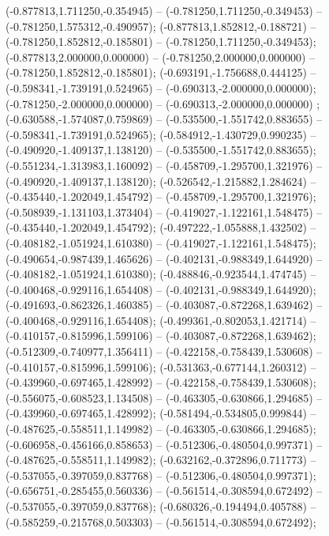  (-0.877813,1.711250,-0.354945) -- (-0.781250,1.711250,-0.349453) -- (-0.781250,1.575312,-0.490957);
 (-0.877813,1.852812,-0.188721) -- (-0.781250,1.852812,-0.185801) -- (-0.781250,1.711250,-0.349453);
 (-0.877813,2.000000,0.000000) -- (-0.781250,2.000000,0.000000) -- (-0.781250,1.852812,-0.185801);
 (-0.693191,-1.756688,0.444125) -- (-0.598341,-1.739191,0.524965) -- (-0.690313,-2.000000,0.000000);
 (-0.781250,-2.000000,0.000000) -- (-0.690313,-2.000000,0.000000) ;
 (-0.630588,-1.574087,0.759869) -- (-0.535500,-1.551742,0.883655) -- (-0.598341,-1.739191,0.524965);
 (-0.584912,-1.430729,0.990235) -- (-0.490920,-1.409137,1.138120) -- (-0.535500,-1.551742,0.883655);
 (-0.551234,-1.313983,1.160092) -- (-0.458709,-1.295700,1.321976) -- (-0.490920,-1.409137,1.138120);
 (-0.526542,-1.215882,1.284624) -- (-0.435440,-1.202049,1.454792) -- (-0.458709,-1.295700,1.321976);
 (-0.508939,-1.131103,1.373404) -- (-0.419027,-1.122161,1.548475) -- (-0.435440,-1.202049,1.454792);
 (-0.497222,-1.055888,1.432502) -- (-0.408182,-1.051924,1.610380) -- (-0.419027,-1.122161,1.548475);
 (-0.490654,-0.987439,1.465626) -- (-0.402131,-0.988349,1.644920) -- (-0.408182,-1.051924,1.610380);
 (-0.488846,-0.923544,1.474745) -- (-0.400468,-0.929116,1.654408) -- (-0.402131,-0.988349,1.644920);
 (-0.491693,-0.862326,1.460385) -- (-0.403087,-0.872268,1.639462) -- (-0.400468,-0.929116,1.654408);
 (-0.499361,-0.802053,1.421714) -- (-0.410157,-0.815996,1.599106) -- (-0.403087,-0.872268,1.639462);
 (-0.512309,-0.740977,1.356411) -- (-0.422158,-0.758439,1.530608) -- (-0.410157,-0.815996,1.599106);
 (-0.531363,-0.677144,1.260312) -- (-0.439960,-0.697465,1.428992) -- (-0.422158,-0.758439,1.530608);
 (-0.556075,-0.608523,1.134508) -- (-0.463305,-0.630866,1.294685) -- (-0.439960,-0.697465,1.428992);
 (-0.581494,-0.534805,0.999844) -- (-0.487625,-0.558511,1.149982) -- (-0.463305,-0.630866,1.294685);
 (-0.606958,-0.456166,0.858653) -- (-0.512306,-0.480504,0.997371) -- (-0.487625,-0.558511,1.149982);
 (-0.632162,-0.372896,0.711773) -- (-0.537055,-0.397059,0.837768) -- (-0.512306,-0.480504,0.997371);
 (-0.656751,-0.285455,0.560336) -- (-0.561514,-0.308594,0.672492) -- (-0.537055,-0.397059,0.837768);
 (-0.680326,-0.194494,0.405788) -- (-0.585259,-0.215768,0.503303) -- (-0.561514,-0.308594,0.672492);
